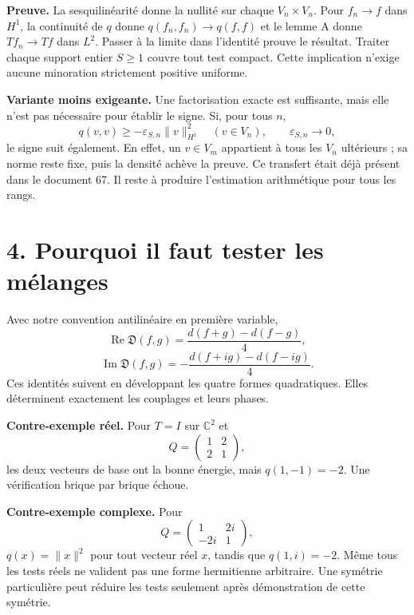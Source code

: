 \documentclass[
  11pt,
]{article}
\begin{document}
\textbf{Preuve.} La sesquilinéarité donne la nullité sur chaque
\(V_n\times V_n\). Pour \(f_n\to f\) dans \(H^1\), la continuité de
\(q\) donne \(q(f_n,f_n)\to q(f,f)\) et le lemme A donne \(Tf_n\to Tf\)
dans \(L^2\). Passer à la limite dans l'identité prouve le résultat.
Traiter chaque support entier \(S\ge1\) couvre tout test compact. Cette
implication n'exige aucune minoration strictement positive uniforme.

\textbf{Variante moins exigeante.} Une factorisation exacte est
suffisante, mais elle n'est pas nécessaire pour établir le signe. Si,
pour tous \(n\), \[
q(v,v)\ge-\varepsilon_{S,n}\|v\|_{H^1}^2
\quad(v\in V_n),\qquad\varepsilon_{S,n}\longrightarrow0,
\] le signe suit également. En effet, un \(v\in V_m\) appartient à tous
les \(V_n\) ultérieurs ; sa norme reste fixe, puis la densité achève la
preuve. Ce transfert était déjà présent dans le document 67. Il reste à
produire l'estimation arithmétique pour tous les rangs.

\hypertarget{pourquoi-il-faut-tester-les-muxe9langes}{%
\section{4. Pourquoi il faut tester les
mélanges}\label{pourquoi-il-faut-tester-les-muxe9langes}}

Avec notre convention antilinéaire en première variable, \[
\operatorname{Re}\mathfrak D(f,g)
=\frac{d(f+g)-d(f-g)}4,
\] \[
\operatorname{Im}\mathfrak D(f,g)
=-\frac{d(f+ig)-d(f-ig)}4.
\] Ces identités suivent en développant les quatre formes quadratiques.
Elles déterminent exactement les couplages et leurs phases.

\textbf{Contre-exemple réel.} Pour \(T=I\) sur \(\mathbb C^2\) et \[
Q=\begin{pmatrix}1&2\\2&1\end{pmatrix},
\] les deux vecteurs de base ont la bonne énergie, mais \(q(1,-1)=-2\).
Une vérification brique par brique échoue.

\textbf{Contre-exemple complexe.} Pour \[
Q=\begin{pmatrix}1&2i\\-2i&1\end{pmatrix},
\] \(q(x)=\|x\|^2\) pour tout vecteur réel \(x\), tandis que
\(q(1,i)=-2\). Même tous les tests réels ne valident pas une forme
hermitienne arbitraire. Une symétrie particulière peut réduire les tests
seulement après démonstration de cette symétrie.
\end{document}
